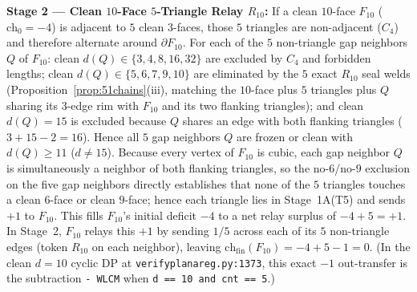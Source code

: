 \documentclass[11pt,reqno]{amsart}
\theoremstyle{plain}
\theoremstyle{definition}
\theoremstyle{remark}
\newcommand{\chz}{\mathrm{ch}_0}
\newcommand{\chf}{\mathrm{ch}_{\mathrm{fin}}}
\DeclareRobustCommand{\_}{\ifmmode\text{\textunderscore}\else\textunderscore\allowbreak\fi}
\begin{document}
\noindent\textbf{Stage 2 --- Clean $10$-Face $5$-Triangle Relay $R_{10}$:}
If a clean $10$-face $F_{10}$ ($\chz = -4$) is adjacent to $5$ clean $3$-faces, those $5$ triangles are non-adjacent ($C_4$) and therefore alternate around $\partial F_{10}$. For each of the $5$ non-triangle gap neighbors $Q$ of $F_{10}$: clean $d(Q) \in \{3, 4, 8, 16, 32\}$ are excluded by $C_4$ and forbidden lengths; clean $d(Q) \in \{5, 6, 7, 9, 10\}$ are eliminated by the $5$ exact $R_{10}$ seal welds (Proposition~\ref{prop:51chains}(iii), matching the $10$-face plus $5$ triangles plus $Q$ sharing its $3$-edge rim with $F_{10}$ and its two flanking triangles); and clean $d(Q) = 15$ is excluded because $Q$ shares an edge with both flanking triangles ($3+15-2=16$). Hence all $5$ gap neighbors $Q$ are frozen or clean with $d(Q) \ge 11$ ($d \neq 15$). Because every vertex of $F_{10}$ is cubic, each gap neighbor $Q$ is simultaneously a neighbor of both flanking triangles, so the no-$6$/no-$9$ exclusion on the five gap neighbors directly establishes that none of the $5$ triangles touches a clean $6$-face or clean $9$-face; hence each triangle lies in Stage~1A(T5) and sends $+1$ to $F_{10}$. This fills $F_{10}$'s initial deficit $-4$ to a net relay surplus of $-4 + 5 = +1$. In Stage~2, $F_{10}$ relays this $+1$ by sending $1/5$ across each of its $5$ non-triangle edges (token $R_{10}$ on each neighbor), leaving $\chf(F_{10}) = -4 + 5 - 1 = 0$. (In the clean $d=10$ cyclic DP at \texttt{verify\_planar\_eg.py:1373}, this exact $-1$ out-transfer is the subtraction \texttt{- W\_LCM} when \texttt{d == 10 and cnt == 5}.)
\end{document}
